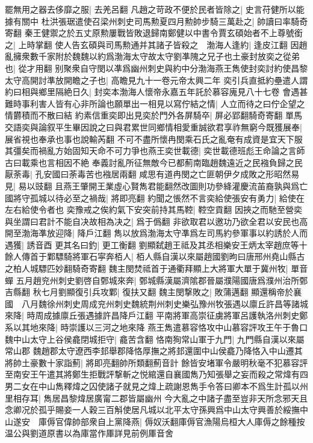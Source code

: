 罷無用之器去侈靡之服|{
	去羌呂翻}
凡趙之苛政不便於民者皆除之|{
	史言苻健所以能據有關中}
杜洪張琚遣使召梁州刺史司馬勲夏四月勲帥步騎三萬赴之|{
	帥讀曰率騎奇寄翻}
秦王健禦之於五丈原勲屢戰皆敗退歸南鄭健以中書令賈玄碩始者不上尊號銜之|{
	上時掌翻}
使人告玄碩與司馬勲通并其諸子皆殺之　渤海人逢約|{
	逢皮江翻}
因趙亂擁衆數千家附於魏魏以約爲渤海太守故太守劉凖隗之兄子也土豪封放奕之從弟也|{
	從才用翻}
别聚衆自守閔以凖爲幽州刺史與約中分渤海燕王雋使封奕討約使昌黎太守高開討準放開瞻之子也|{
	高瞻見九十一卷元帝太興二年}
奕引兵直抵約壘遣人謂約曰相與鄉里隔絶日久|{
	封奕本渤海人懷帝永嘉五年託於慕容廆見八十七卷}
會遇甚難時事利害人皆有心非所論也願單出一相見以寫佇結之情|{
	人立而待之曰佇企望之情欝積而不散曰結}
約素信重奕即出見奕於門外各屏騎卒|{
	屏必郢翻騎奇寄翻}
單馬交語奕與論叙平生畢因說之曰與君累世同鄉情相愛重誠欲君享祚無窮今既獲展奉|{
	展省視也奉承也事也說輸芮翻}
不可不盡所懷冉閔乘石氏之亂奄有成資是宜天下服其彊矣而禍亂方始固知天命不可力爭也燕王奕世載德|{
	奕世載德班彪王命論之言師古曰載乘也言相因不絶}
奉義討亂所征無敵今已都薊南臨趙魏遠近之民襁負歸之民厭荼毒|{
	孔安國曰荼毒苦也襁居兩翻}
咸思有道冉閔之亡匪朝伊夕成敗之形昭然易見|{
	易以豉翻}
且燕王肇開王業虛心賢雋君能翻然改圖則功參絳灌慶流苖裔孰與爲亡國將守孤城以待必至之禍哉|{
	將即亮翻}
約聞之悵然不言奕給使張安有勇力|{
	給使在左右給使令者也}
奕豫戒之俟約氣下安突前持其馬鞚|{
	鞚空貢翻}
因挾之而馳至營奕與坐謂曰君計不能自决故相為决之|{
	爲于僞翻}
非欲取君以邀功乃欲全君以安民也高開至渤海凖放迎降|{
	降戶江翻}
雋以放爲渤海太守凖爲左司馬約參軍事以約誘於人而遇獲|{
	誘音酉}
更其名曰釣|{
	更工衡翻}
劉顯弑趙王祗及其丞相樂安王炳太宰趙庶等十餘人傳首于鄴驃騎將軍石寜奔栢人|{
	栢人縣自漢以來屬趙國劉昫曰唐邢州堯山縣古之柏人城驃匹妙翻騎奇寄翻}
魏主閔焚祗首于通衢拜顯上大將軍大單于冀州牧|{
	單音蟬}
五月趙兖州刺史劉啓自鄄城來奔|{
	鄄城縣漢屬濟隂郡晉屬濮陽國唐爲濮州治所鄄吉縣翻}
秋七月劉顯復引兵攻鄴|{
	復扶又翻}
魏主閔撃敗之|{
	敗蒲邁翻}
顯還稱帝於襄國　八月魏徐州刺史周成兖州刺史魏統荆州刺史樂弘豫州牧張遇以廪丘許昌等諸城來降|{
	時周成據廪丘張遇據許昌降戶江翻}
平南將軍高崇征虜將軍呂護執洛州刺史鄭系以其地來降|{
	時崇護以三河之地來降}
燕王雋遣慕容恪攻中山慕容評攻王午于魯口魏中山太守上谷侯龕閉城拒守|{
	龕苦含翻}
恪南狥常山軍于九門|{
	九門縣自漢以來屬常山郡}
魏趙郡太守遼西李邽舉郡降恪厚撫之將邽還圍中山侯龕乃降恪入中山遷其將帥土豪數十家詣薊|{
	將即亮翻帥所類翻薊音計}
餘皆安堵軍令嚴明秋毫不犯慕容評至南安王午遣其將鄭生拒戰評撃斬之悦綰還自襄國雋乃知張舉之妄而殺之常煒有四男二女在中山雋釋煒之囚使諸子就見之煒上疏謝恩雋手令答曰卿本不爲生計孤以州里相存耳|{
	雋居昌黎煒居廣甯二郡皆屬幽州}
今大亂之中諸子盡至豈非天所念邪天且念卿况於孤乎賜妾一人穀三百斛使居凡城以北平太守孫興爲中山太守興善於綏撫中山遂安　庫傉官偉帥部衆自上黨降燕|{
	傉奴沃翻庫傉官漁陽烏桓大人庫傉之餘種按温公與劉道原書以為庫當作厙詳見前例厙音舍}
